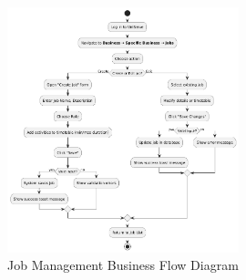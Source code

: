 \documentclass[]{VUMIFTemplateClass}
\begin{document}
\begin{figure}[H]
    \centering
    \includegraphics[width=0.6\textwidth]{docs/ps-design/design-document/images/diagrams/business/bpmn_manage_jobs.png}
    \caption{Job Management Business Flow Diagram}
    \label{fig:manage_jobs_business_flow}
\end{figure}
\end{document}
